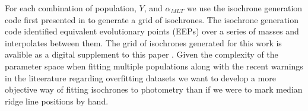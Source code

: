 For each combination of population, $Y$, and $\alpha_{MLT}$ we use the
isochrone generation code first presented in \citet{Dotter2016} to generate a
grid of isochrones. The isochrone generation code identified equivalent
evolutionary points (EEPs) over a series of masses and interpolates between
them. The grid of isochrones generated for this work is avalible as a digital
supplement to this paper . Given the complexity of the parameter space when
fitting multiple populations along with the recent warnings in the liteerature
regarding overfitting datasets \citep[e.g. ][]{Valle2022} we want to develop a
more objective way of fitting isochrones to photometry than if we were to mark
median ridge line positions by hand.

